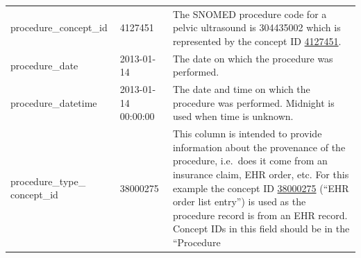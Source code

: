 \documentclass[11pt]{book}
\begin{document}
\begin{longtable}[]{@{}lll@{}}
\begin{minipage}[t]{0.28\columnwidth}
procedure\_concept\_id\strut
\end{minipage} & \begin{minipage}[t]{0.16\columnwidth}\raggedright\strut
4127451\strut
\end{minipage} & \begin{minipage}[t]{0.48\columnwidth}\raggedright\strut
The SNOMED procedure code for a pelvic ultrasound is 304435002 which is
represented by the concept ID
\href{http://athena.ohdsi.org/search-terms/terms/4127451}{4127451}.\strut
\end{minipage}\tabularnewline
\begin{minipage}[t]{0.28\columnwidth}\raggedright\strut
procedure\_date\strut
\end{minipage} & \begin{minipage}[t]{0.16\columnwidth}\raggedright\strut
2013-01-14\strut
\end{minipage} & \begin{minipage}[t]{0.48\columnwidth}\raggedright\strut
The date on which the procedure was performed.\strut
\end{minipage}\tabularnewline
\begin{minipage}[t]{0.28\columnwidth}\raggedright\strut
procedure\_datetime\strut
\end{minipage} & \begin{minipage}[t]{0.16\columnwidth}\raggedright\strut
2013-01-14 00:00:00\strut
\end{minipage} & \begin{minipage}[t]{0.48\columnwidth}\raggedright\strut
The date and time on which the procedure was performed. Midnight is used
when time is unknown.\strut
\end{minipage}\tabularnewline
\begin{minipage}[t]{0.28\columnwidth}\raggedright\strut
procedure\_type\_ concept\_id\strut
\end{minipage} & \begin{minipage}[t]{0.16\columnwidth}\raggedright\strut
38000275\strut
\end{minipage} & \begin{minipage}[t]{0.48\columnwidth}\raggedright\strut
This column is intended to provide information about the provenance of
the procedure, i.e.~does it come from an insurance claim, EHR order,
etc. For this example the concept ID
\href{http://athena.ohdsi.org/search-terms/terms/38000275}{38000275}
(``EHR order list entry'') is used as the procedure record is from an
EHR record. Concept IDs in this field should be in the ``Procedure

\end{minipage}
\end{longtable}
\end{document}
